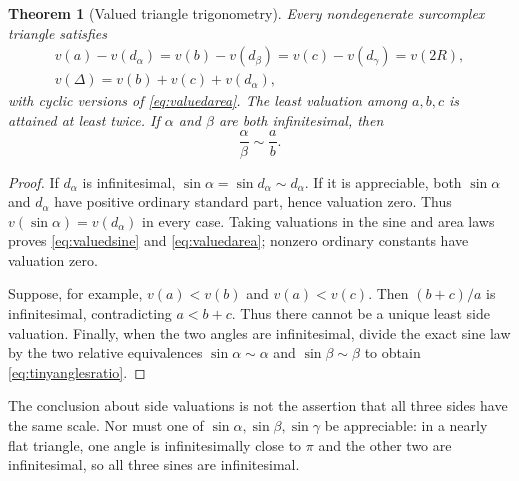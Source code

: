 \documentclass[11pt,letterpaper]{article}
\newtheorem{theorem}{Theorem}[section]
\theoremstyle{definition}
\theoremstyle{remark}
\numberwithin{equation}{section}
\begin{document}
\begin{theorem}[Valued triangle trigonometry]\label{thm:valuedsine}
Every nondegenerate surcomplex triangle satisfies
\begin{gather}\label{eq:valuedsine}
 v(a)-v(d_\alpha)=v(b)-v(d_\beta)=v(c)-v(d_\gamma)=v(2R),\\
 v(\Delta)=v(b)+v(c)+v(d_\alpha),\label{eq:valuedarea}
\end{gather}
with cyclic versions of \eqref{eq:valuedarea}. The least valuation among $a,b,c$ is attained at least twice. If $\alpha$ and $\beta$ are both infinitesimal, then
\begin{equation}\label{eq:tinyanglesratio}
 \frac{\alpha}{\beta}\sim\frac ab.
\end{equation}
\end{theorem}
\begin{proof}
If $d_\alpha$ is infinitesimal, $\sin\alpha=\sin d_\alpha\sim d_\alpha$. If it is appreciable, both $\sin\alpha$ and $d_\alpha$ have positive ordinary standard part, hence valuation zero. Thus $v(\sin\alpha)=v(d_\alpha)$ in every case. Taking valuations in the sine and area laws proves \eqref{eq:valuedsine} and \eqref{eq:valuedarea}; nonzero ordinary constants have valuation zero.

Suppose, for example, $v(a)<v(b)$ and $v(a)<v(c)$. Then $(b+c)/a$ is infinitesimal, contradicting $a<b+c$. Thus there cannot be a unique least side valuation. Finally, when the two angles are infinitesimal, divide the exact sine law by the two relative equivalences $\sin\alpha\sim\alpha$ and $\sin\beta\sim\beta$ to obtain \eqref{eq:tinyanglesratio}.
\end{proof}
The conclusion about side valuations is not the assertion that all three sides have the same scale. Nor must one of $\sin\alpha,\sin\beta,\sin\gamma$ be appreciable: in a nearly flat triangle, one angle is infinitesimally close to $\pi$ and the other two are infinitesimal, so all three sines are infinitesimal.
\end{document}
